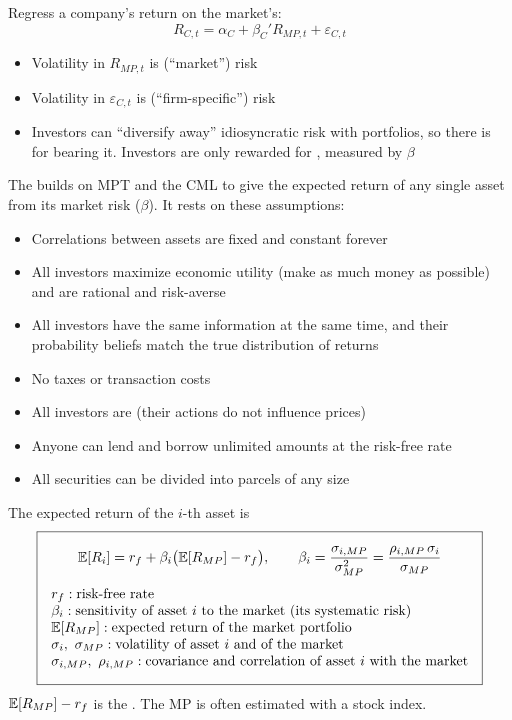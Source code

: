 Regress a company's return on the market's:
\[R_{C,t} = \alpha_C + \beta_C' R_{MP,t} + \varepsilon_{C,t}\]
\begin{itemize}
    \item Volatility in $R_{MP,t}$ is  (``market'') risk
    \item Volatility in $\varepsilon_{C,t}$ is  (``firm-specific'') risk
    \item Investors can ``diversify away'' idiosyncratic risk with portfolios, so there is  for bearing it. Investors are only rewarded for , measured by $\beta$
\end{itemize}

The  builds on MPT and the CML to give
the expected return of any single asset from its market risk ($\beta$). It
rests on these assumptions:
\begin{itemize}
    \item Correlations between assets are fixed and constant forever
    \item All investors maximize economic utility (make as much money as possible) and are rational and risk-averse
    \item All investors have the same information at the same time, and their probability beliefs match the true distribution of returns
    \item No taxes or transaction costs
    \item All investors are  (their actions do not influence prices)
    \item Anyone can lend and borrow unlimited amounts at the risk-free rate
    \item All securities can be divided into parcels of any size
\end{itemize}

\begin{definition}[CAPM]
    The expected return of the $i$-th asset is
    \[\boxed{\begin{gathered}
        \E[R_i] = r_f + \beta_i\big(\E[R_{MP}] - r_f\big), \qquad
        \beta_i = \frac{\sigma_{i,MP}}{\sigma_{MP}^2} = \frac{\rho_{i,MP}\,\sigma_i}{\sigma_{MP}}\\[4pt]
        \begin{array}{@{}l@{}}
            r_f: \text{risk-free rate}\\
            \beta_i: \text{sensitivity of asset } i \text{ to the market (its systematic risk)}\\
            \E[R_{MP}]: \text{expected return of the market portfolio}\\
            \sigma_i,\ \sigma_{MP}: \text{volatility of asset } i \text{ and of the market}\\
            \sigma_{i,MP},\ \rho_{i,MP}: \text{covariance and correlation of asset } i \text{ with the market}
        \end{array}
    \end{gathered}}\]
    $\mathbb{E}[R_{MP}] - r_f$ is the . The MP is often
    estimated with a stock index.
\end{definition}

